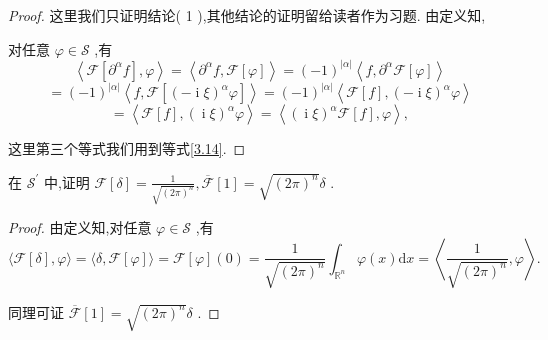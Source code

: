 \documentclass[lang=cn,newtx,10pt,scheme=chinese,thmcnt=chapter]{elegantbook}
\newcommand{\dif}{\mathrm{d}}
\newcommand{\ci}{\operatorname{i}}
\begin{document}
\begin{proof}
  这里我们只证明结论( 1 ),其他结论的证明留给读者作为习题. 由定义知,

对任意 \(\varphi  \in  \mathcal{S}\) ,有
\begin{equation*}
\left\langle  {\mathcal{F}\left\lbrack  {{\partial }^{\alpha }f}\right\rbrack  ,\varphi }\right\rangle   = \left\langle  {{\partial }^{\alpha }f,\mathcal{F}\left\lbrack  \varphi \right\rbrack  }\right\rangle   = {\left( -1\right) }^{\left| \alpha \right| }\left\langle  {f,{\partial }^{\alpha }\mathcal{F}\left\lbrack  \varphi \right\rbrack  }\right\rangle
\end{equation*}
\begin{equation*}
= {\left( -1\right) }^{\left| \alpha \right| }\left\langle  {f,\mathcal{F}\left\lbrack  {{\left( -\ci\xi \right) }^{\alpha }\varphi }\right\rbrack  }\right\rangle   = {\left( -1\right) }^{\left| \alpha \right| }\left\langle  {\mathcal{F}\left\lbrack  f\right\rbrack  ,{\left( -\ci\xi \right) }^{\alpha }\varphi }\right\rangle
\end{equation*}
\begin{equation*}
= \left\langle  {\mathcal{F}\left\lbrack  f\right\rbrack  ,{\left( \ci\xi \right) }^{\alpha }\varphi }\right\rangle   = \left\langle  {{\left( \ci\xi \right) }^{\alpha }\mathcal{F}\left\lbrack  f\right\rbrack  ,\varphi }\right\rangle  ,
\end{equation*}

这里第三个等式我们用到等式\ref{3.14}.
\end{proof}

\begin{example}
  在 \({\mathcal{S}}^{\prime }\) 中,证明 \(\mathcal{F}\left\lbrack  \delta \right\rbrack   = \frac{1}{\sqrt{{\left( 2\pi \right) }^{n}}},\overline{\mathcal{F}}\left\lbrack  1\right\rbrack   = \sqrt{{\left( 2\pi \right) }^{n}}\delta\) .
\end{example}
\begin{proof}
  由定义知,对任意 \(\varphi  \in  \mathcal{S}\) ,有
\begin{equation*}
\langle \mathcal{F}\left\lbrack  \delta \right\rbrack  ,\varphi \rangle  = \langle \delta ,\mathcal{F}\left\lbrack  \varphi \right\rbrack  \rangle  = \mathcal{F}\left\lbrack  \varphi \right\rbrack  \left( 0\right)  = \frac{1}{\sqrt{{\left( 2\pi \right) }^{n}}}{\int }_{{\mathbb{R}}^{n}}\varphi \left( x\right) {\dif x} = \left\langle  {\frac{1}{\sqrt{{\left( 2\pi \right) }^{n}}},\varphi }\right\rangle  .
\end{equation*}


同理可证 \(\overline{\mathcal{F}}\left\lbrack  1\right\rbrack   = \sqrt{{\left( 2\pi \right) }^{n}}\delta\) .
\end{proof}
\end{document}

